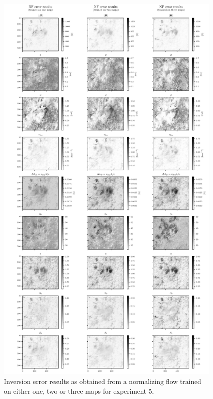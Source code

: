 \documentclass[a4paper,12pt]{report}
\begin{document}
\begin{figure}[h]
\centering
\includegraphics[height=\textheight-1cm]{figures/nf-milne-eddington-example-5-nflows-piecewisequadratic-comp-ME-NF-errors.pdf}
\caption{Inversion error results as obtained from a normalizing flow trained on either one, two or three maps for experiment 5.}
\label{fig:nf-milne-eddington-example-5-nflows-piecewisequadratic-comp-ME-NF-errors}
\end{figure}
\end{document}
